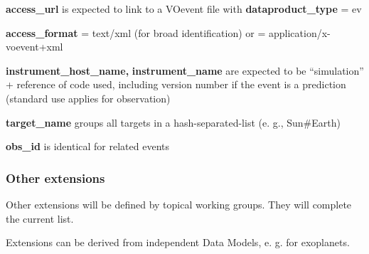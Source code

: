 \documentclass[11pt,a4paper]{ivoa}
\begin{document}
\textbf{access\_url} is expected to link to a VOevent file with \textbf{dataproduct\_type} = ev 

\textbf{access\_format} = text/xml (for broad identification) or = application/x-voevent+xml 

\textbf{instrument\_host\_name,} \textbf{instrument\_name} are expected to be ``simulation'' + reference of code used, including version number if the event is a prediction (standard use applies for observation)

\textbf{target\_name} groups all targets in a hash-separated-list (e. g., Sun\#Earth)

\textbf{obs\_id} is identical for related events

\subsubsection{Other extensions}

Other extensions will be defined by topical working groups. They will complete the current list.

Extensions can be derived from independent Data Models, e. g. for exoplanets.



\end{document}
